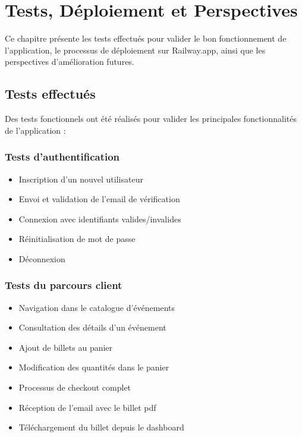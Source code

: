 \documentclass[a4paper,12pt,twoside]{report}
\begin{document}
\chapter{Tests, Déploiement et Perspectives}
\thispagestyle{empty}

Ce chapitre présente les tests effectués pour valider le bon fonctionnement de l'application, le processus de déploiement sur Railway.app, ainsi que les perspectives d'amélioration futures.

\section{Tests effectués}

Des tests fonctionnels ont été réalisés pour valider les principales fonctionnalités de l'application :

\subsection{Tests d'authentification}
\begin{itemize}
    \item Inscription d'un nouvel utilisateur
    \item Envoi et validation de l'email de vérification
    \item Connexion avec identifiants valides/invalides
    \item Réinitialisation de mot de passe
    \item Déconnexion
\end{itemize}

\subsection{Tests du parcours client}
\begin{itemize}
    \item Navigation dans le catalogue d'événements
    \item Consultation des détails d'un événement
    \item Ajout de billets au panier
    \item Modification des quantités dans le panier
    \item Processus de checkout complet
    \item Réception de l'email avec le billet \gls{pdf}
    \item Téléchargement du billet depuis le dashboard
\end{itemize}
\end{document}
